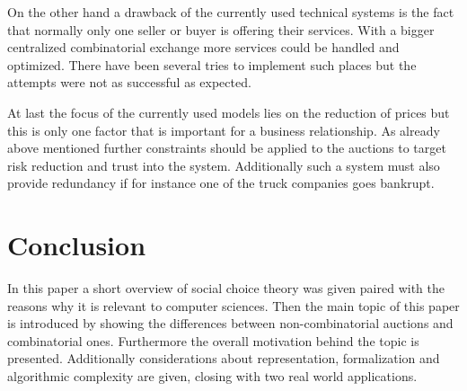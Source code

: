\documentclass[a4paper]{paper}
\begin{document}
On the other hand a drawback of the currently used technical systems is the fact that normally only one seller or buyer is offering their services. With a bigger centralized combinatorial exchange more services could be handled and optimized. There have been several tries to implement such places but the attempts were not as successful as expected.

At last the focus of the currently used models lies on the reduction of prices but this is only one factor that is important for a business relationship. As already above mentioned further constraints should be applied to the auctions to target risk reduction and trust into the system. Additionally such a system must also provide redundancy if for instance one of the truck companies goes bankrupt. 

\section{Conclusion}

In this paper a short overview of social choice theory was given paired with the reasons why it is relevant to computer sciences. Then the main topic of this paper is introduced by showing the differences between non-combinatorial auctions and combinatorial ones. Furthermore the overall motivation behind the topic is presented. Additionally considerations about representation, formalization and algorithmic complexity are given, closing with two real world applications. 


\end{document}
